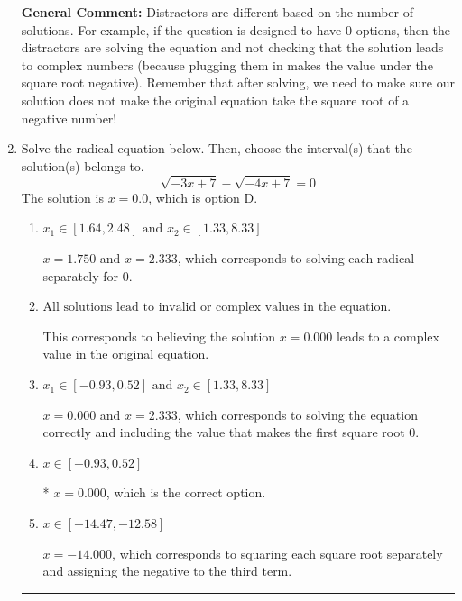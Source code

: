 \documentclass{extbook}[14pt]
\newcommand{\litem}[1]{\item #1

\rule{\textwidth}{0.4pt}}
\begin{document}
\begin{enumerate}
{\textbf{General Comment:} Distractors are different based on the number of solutions. For example, if the question is designed to have 0 options, then the distractors are solving the equation and not checking that the solution leads to complex numbers (because plugging them in makes the value under the square root negative). Remember that after solving, we need to make sure our solution does not make the original equation take the square root of a negative number!
}
\litem{
Solve the radical equation below. Then, choose the interval(s) that the solution(s) belongs to.
\[ \sqrt{-3 x + 7} - \sqrt{-4 x + 7} = 0 \]The solution is \( x = 0.0 \), which is option D.\begin{enumerate}[label=\Alph*.]
\item \( x_1 \in [1.64, 2.48] \text{ and } x_2 \in [1.33,8.33] \)

$x = 1.750$ and $x = 2.333$, which corresponds to solving each radical separately for 0.
\item \( \text{All solutions lead to invalid or complex values in the equation.} \)

This corresponds to believing the solution $x = 0.000$ leads to a complex value in the original equation.
\item \( x_1 \in [-0.93, 0.52] \text{ and } x_2 \in [1.33,8.33] \)

$x = 0.000$ and $x = 2.333$, which corresponds to solving the equation correctly and including the value that makes the first square root 0.
\item \( x \in [-0.93,0.52] \)

* $x = 0.000$, which is the correct option.
\item \( x \in [-14.47,-12.58] \)

$x = -14.000$, which corresponds to squaring each square root separately and assigning the negative to the third term.
\end{enumerate}

}
\end{enumerate}
\end{document}
